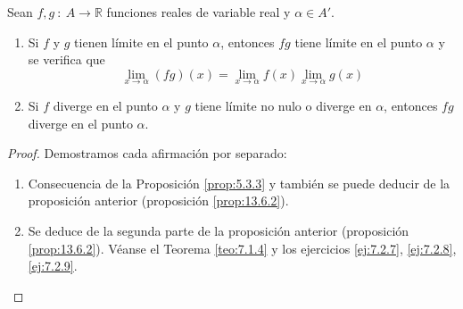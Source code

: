\begin{coro}
    Sean $f,g ~:~ A \longrightarrow \mathbb{R}$ funciones reales de variable real y $\alpha \in A'$.
    \begin{enumerate}
        \item Si $f$ y $g$ tienen límite en el punto $\alpha$, entonces $fg$ tiene límite en el punto $\alpha$ y se verifica que
        \begin{equation*}
            \displaystyle\lim_{x \to \alpha} (fg)(x) = \displaystyle\lim_{x \to \alpha} f(x) \displaystyle\lim_{x \to \alpha} g(x)
        \end{equation*}

        \item Si $f$ diverge en el punto $\alpha$ y $g$ tiene límite no nulo o diverge en $\alpha$, entonces $fg$ diverge en el punto $\alpha$.
    \end{enumerate}
\end{coro}
\begin{proof}
    Demostramos cada afirmación por separado:
    \begin{enumerate}
        \item Consecuencia de la Proposición \ref{prop:5.3.3} y también se puede deducir de la proposición anterior (proposición \ref{prop:13.6.2}).

        \item Se deduce de la segunda parte de la proposición anterior (proposición \ref{prop:13.6.2}). Véanse el Teorema \ref{teo:7.1.4} y los ejercicios \ref{ej:7.2.7}, \ref{ej:7.2.8}, \ref{ej:7.2.9}.
    \end{enumerate}
\end{proof}

